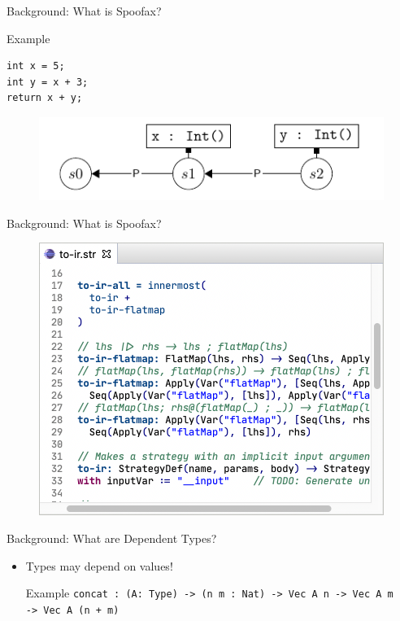 \documentclass[aspectratio=43]{beamer}
\begin{document}
\begin{frame}[fragile]{Background: What is Spoofax?}

\begin{exampleblock}{Example}
\begin{lstlisting}
int x = 5;
int y = x + 3;
return x + y;
\end{lstlisting}
\end{exampleblock}

\begin{figure}
	\includegraphics[width=0.7\linewidth]{img/screenshot005}
\end{figure}


\end{frame}

\begin{frame}[fragile]{Background: What is Spoofax?}
	\begin{figure}
		\includegraphics[width=0.8\linewidth]{img/transformation}
	\end{figure}
\end{frame}

\begin{frame}[fragile]{Background: What are Dependent Types?}
\begin{itemize}
	\item Types may depend on values!
	\begin{exampleblock}{Example}
		\texttt{concat : (A: Type) -> (n m : Nat) -> Vec A n -> Vec A m
			\\ \hspace*{48pt} -> Vec A (n + m)}
	\end{exampleblock}
\end{itemize}
\end{frame}
\end{document}
